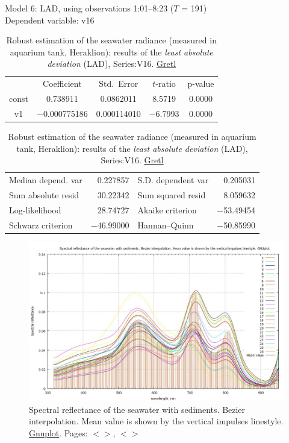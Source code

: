 \documentclass[11pt]{article}
\begin{document}
\begin{appendices}
\begin{table}
	\caption{Robust estimation of the seawater radiance (measured in aquarium tank, Heraklion): results of the \textit{least absolute deviation} (LAD), Series:V16. \href{http://gretl.sourceforge.net/}{Gretl}}
	\begin{center}
		Model 6: LAD, using observations 1:01--8:23 ($T$ = 191)\\
		Dependent variable: v16\\
	\vspace{1em}

	\begin{tabular}{|c c c c c|}
		  & {Coefficient} & {Std.\ Error} & {$t$-ratio} & {p-value} \\[1ex]
		const &   0.738911 &     0.0862011 &       8.5719 &         0.0000 \\
		v1 &   $-$0.000775186 &     0.000114010 &       $-$6.7993 &         0.0000 \\
	\end{tabular}

	\vspace{1ex}
	\begin{tabular}{lrlr}
		Median depend. var &  0.227857 & S.D. dependent var &  0.205031 \\
		Sum absolute resid &  30.22342 & Sum squared resid &  8.059632 \\
		Log-likelihood &  28.74727 & Akaike criterion & $-$53.49454 \\
		Schwarz criterion & $-$46.99000 & Hannan--Quinn & $-$50.85990 \\
	\end{tabular}
	\label{tab:12}
	\end{center}
\end{table}

\begin{figure}[H]
	\begin{center}
		\includegraphics[scale=0.25]{GNU-09.jpg}
		\caption{Spectral reflectance of the seawater with sediments. Bezier interpolation. Mean value is shown by the vertical impulses linestyle. \href{http://www.gnuplot.info/}{Gnuplot}. Pages: $<$\pageref{dataprep}$>$­, $<$\pageref{page-31}$>$}
		\label{fig:A.23}
	\end{center}
\end{figure}


\end{appendices}
\end{document}

